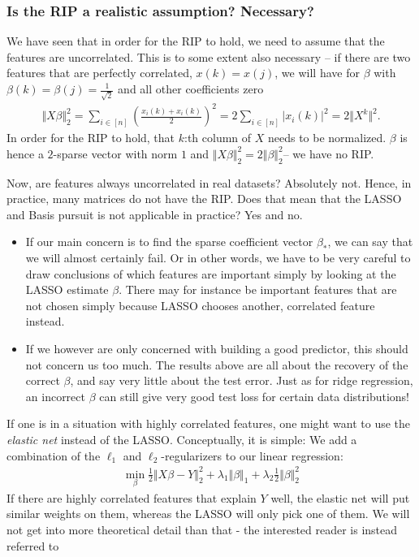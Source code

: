 \documentclass{article}
\newcommand{\abs}[1]{\vert #1 \vert}
\newcommand{\norm}[1]{\Vert #1 \Vert}
\begin{document}
\subsubsection{Is the RIP a realistic assumption? Necessary?} We have seen that in order for the RIP to hold, we need to assume that the features are uncorrelated. This is to some extent also necessary -- if there are two features that are perfectly correlated, $x(k)=x(j)$, we will have for $\beta$ with $\beta(k)=\beta(j)= \tfrac{1}{\sqrt{2}}$ and all other coefficients zero
\begin{align*}
    \norm{X\beta}_2^2 = \sum_{i \in [n]} ( \frac{x_i(k)+x_i(k)}{2})^2  = 2 \sum_{i\in [n]}\abs{x_i(k)}^2 = 2 \norm{X^k}^2.
\end{align*}
In order for the RIP to hold, that $k$:th column of $X$ needs to be normalized. $\beta$ is hence a $2$-sparse vector with norm $1$ and $\norm{X\beta}_2^2=2\norm{\beta}_2^2$-- we have no RIP.

Now, are features always uncorrelated in real datasets? Absolutely not. Hence, in practice, many matrices do not have the RIP. Does that mean that the LASSO and Basis pursuit is not applicable in practice? Yes and no.
\begin{itemize}
    \item If our main concern is to find the sparse coefficient vector $\beta_*$, we can say that we will almost certainly fail. Or in other words, we have to be very careful to draw conclusions of which features are important simply by looking at the LASSO estimate $\beta$. There may for instance be important features that are not chosen simply because LASSO chooses another, correlated feature instead.
    \item If we however are only concerned with building a good predictor, this should not concern us too much. The results above are all about the recovery of the correct $\beta$, and say very little about the test error. Just as for ridge regression, an incorrect $\beta$ can still give very good test loss for certain data distributions! 
\end{itemize}

If one is in a situation with highly correlated features, one might want to use the \emph{elastic net} instead of the LASSO. Conceptually, it is simple: We add a combination of the $\ell_1$ and $\ell_2$-regularizers to our linear regression:
\begin{align*}
    \min_{\beta} \tfrac{1}{2}\norm{X\beta-Y}_2^2 + \lambda_1 \norm{\beta}_1 + \lambda_2 \tfrac{1}{2}\norm{\beta}_2^2
\end{align*}
If there are highly correlated features that explain $Y$ well, the elastic net will put similar weights on them, whereas the LASSO will only pick one of them. We will not get into more theoretical detail than that - the interested reader is instead referred to \cite{zou2005regularization}
\end{document}
